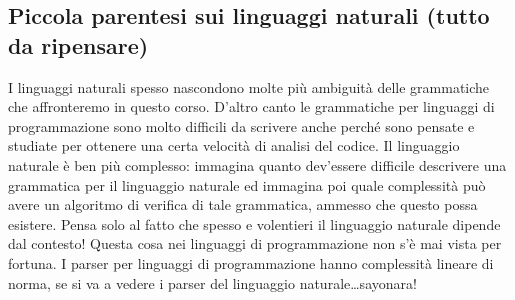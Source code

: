 \documentclass[class=book, crop=false, oneside, 12pt]{standalone}
\begin{document}
\subsection{Piccola parentesi sui linguaggi naturali (tutto da ripensare)}
I linguaggi naturali spesso nascondono molte più ambiguità delle grammatiche che affronteremo in questo corso. D'altro canto le grammatiche per linguaggi di programmazione sono molto difficili da scrivere anche perché sono pensate e studiate per ottenere una certa velocità di analisi del codice. Il linguaggio naturale è ben più complesso: immagina quanto dev’essere difficile descrivere una grammatica per il linguaggio naturale ed immagina poi quale complessità può avere un algoritmo di verifica di tale grammatica, ammesso che questo possa esistere. Pensa solo al fatto che spesso e volentieri il linguaggio naturale dipende dal contesto! Questa cosa nei linguaggi di programmazione non s’è mai vista per fortuna. I parser per linguaggi di programmazione hanno complessità lineare di norma, se si va a vedere i parser del linguaggio naturale\dots  sayonara!
\end{document}

